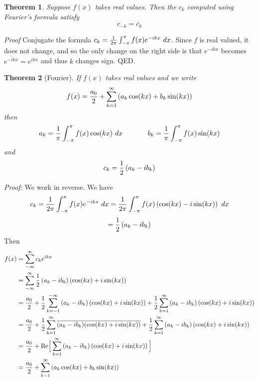 \documentclass[11pt, oneside]{article}   	%
\newtheorem{theorem}{Theorem}
\def\Re{\mbox{Re}}
\begin{document}
 \begin{theorem}
 Suppose $f(x)$ takes real values. Then the $c_k$ computed using Fourier's formula satisfy
 \begin{equation} \label{eq:two}
 c_{-k} = \overline{c_k}
 \end{equation}
\end{theorem}

{\em Proof} Conjugate the formula $c_k = {1 \over {2 \pi}} \int_{- \pi}^\pi f(x) e^{- i k x} \ dx$. Since $f$ is real valued, it does not change, and so the only change on the right side is that $e^{-i k x}$ becomes
$\overline{e^{- i k x}} = e^{i k x}$ and thus $k$ changes sign. QED.



 \begin{theorem}[Fourier]
 If $f(x)$ takes real values and we write
 \[f(x) = {{a_0} \over 2} + \sum_{k = 1}^\infty \left( a_k \cos(kx) + b_k \sin(kx) \right)\]
 then
\[a_k = {1 \over \pi} \int_{- \pi}^\pi f(x) \cos(kx) \ dx \hspace{.5in}  b_k = {1 \over \pi} \int_{- \pi}^\pi f(x) \sin(kx)\]
and
\[c_k = {1 \over 2} \left( a_k - i b_k \right)\]
 \end{theorem}
 
 {\em Proof:} We work in reverse. We have
 \[c_k  = {1 \over {2 \pi}} \int_{- \pi}^\pi f(x) e^{- ikx} \ dx =  {1 \over {2 \pi}} \int_{- \pi}^\pi f(x) \left( \cos(kx) - i \sin(kx) \right) \ dx\]
 \[ = {1 \over 2} \left( a_k - i b_k \right)\] 
 Then
 \begin{align*}
 f(x) &= \sum_{- \infty}^\infty c_k e^{ikx} \\
 &= \sum_{- \infty}^\infty {1 \over 2} \left( a_k - i b_k \right) \left( \cos (kx) + i \sin(kx) \right) \\
 &= {{a_0} \over 2} + {1 \over 2}  \sum_{k = -1}^{-\infty} \left( a_k - i b_k \right) \left( \cos (kx) + i \sin(kx) \right) +  {1 \over 2} \sum_{k = 1}^\infty \left( a_k - i b_k \right) \left( \cos (kx) + i \sin(kx) \right) \\
 &= {{a_0} \over 2} + {1 \over 2}  \sum_{k = 1}^{\infty} \overline{\left( a_k - i b_k \right)} \overline{ \left( \cos (kx) + i \sin(kx) \right) }+ {1 \over 2} \sum_{k = 1}^\infty \left( a_k - i b_k \right) \left( \cos (kx) + i \sin(kx) \right)\\ 
 &= {{a_0} \over 2} + \Re \Big[  \sum_{k = 1}^\infty \left( a_k - i b_k \right) \left( \cos (kx) + i \sin(kx) \right) \Big] \\
 &= {{a_0} \over 2} + \sum_{k = 1}^\infty \left( a_k \cos(kx) + b_k \sin(kx) \right)
 \end{align*}
 
\end{document}
